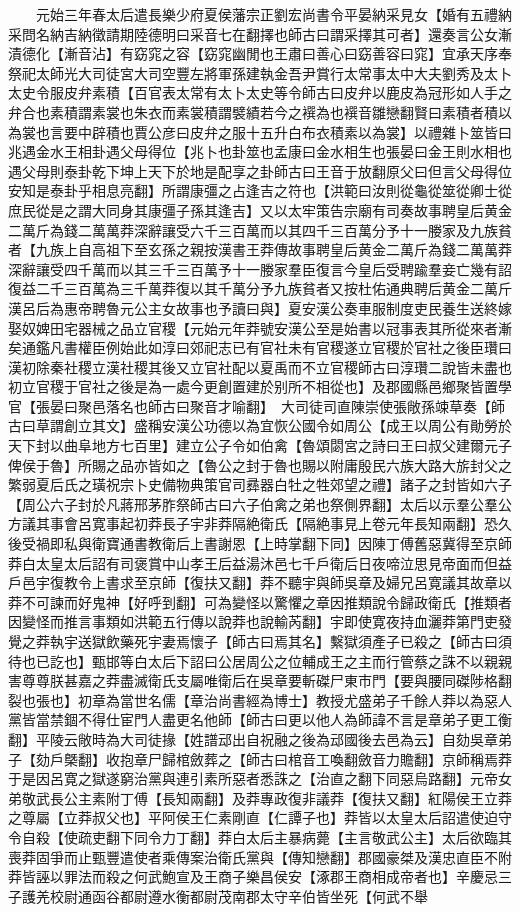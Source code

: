 　　元始三年春太后遣長樂少府夏侯藩宗正劉宏尚書令平晏納采見女【婚有五禮納采問名納吉納徵請期陸德明曰采音七在翻擇也師古曰謂采擇其可者】還奏言公女漸漬德化【漸音沾】有窈窕之容【窈窕幽閒也王肅曰善心曰窈善容曰窕】宜承天序奉祭祀太師光大司徒宮大司空豐左將軍孫建執金吾尹賞行太常事太中大夫劉秀及太卜太史令服皮弁素積【百官表太常有太卜太史等令師古曰皮弁以鹿皮為冠形如人手之弁合也素積謂素裳也朱衣而素裳積謂襞績若今之襈為也襈音雛戀翻賢曰素積者積以為裳也言要中辟積也賈公彦曰皮弁之服十五升白布衣積素以為裳】以禮雜卜筮皆曰兆遇金水王相卦遇父母得位【兆卜也卦筮也孟康曰金水相生也張晏曰金王則水相也遇父母則泰卦乾下坤上天下於地是配享之卦師古曰王音于放翻原父曰但言父母得位安知是泰卦乎相息亮翻】所謂康彊之占逢吉之符也【洪範曰汝則從龜從筮從卿士從庶民從是之謂大同身其康彊子孫其逢吉】又以太牢策告宗廟有司奏故事聘皇后黄金二萬斤為錢二萬萬莽深辭讓受六千三百萬而以其四千三百萬分予十一媵家及九族貧者【九族上自高祖下至玄孫之親按漢書王莽傳故事聘皇后黄金二萬斤為錢二萬萬莽深辭讓受四千萬而以其三千三百萬予十一媵家羣臣復言今皇后受聘踰羣妾亡幾有詔復益二千三百萬為三千萬莽復以其千萬分予九族貧者又按杜佑通典聘后黄金二萬斤漢呂后為惠帝聘魯元公主女故事也予讀曰與】夏安漢公奏車服制度吏民養生送終嫁娶奴婢田宅器械之品立官稷【元始元年莽號安漢公至是始書以冠事表其所從來者漸矣通鑑凡書權臣例始此如淳曰郊祀志已有官社未有官稷遂立官稷於官社之後臣瓚曰漢初除秦社稷立漢社稷其後又立官社配以夏禹而不立官稷師古曰淳瓚二說皆未盡也初立官稷于官社之後是為一處今更創置建於别所不相從也】及郡國縣邑鄉聚皆置學官【張晏曰聚邑落名也師古曰聚音才喻翻】　大司徒司直陳崇使張敞孫竦草奏【師古曰草謂創立其文】盛稱安漢公功德以為宜恢公國令如周公【成王以周公有勛勞於天下封以曲阜地方七百里】建立公子令如伯禽【魯頌閟宮之詩曰王曰叔父建爾元子俾侯于魯】所賜之品亦皆如之【魯公之封于魯也賜以附庸殷民六族大路大旂封父之繁弱夏后氏之璜祝宗卜史備物典策官司彞器白牡之牲郊望之禮】諸子之封皆如六子【周公六子封於凡蔣邢茅胙祭師古曰六子伯禽之弟也祭側界翻】太后以示羣公羣公方議其事會呂寛事起初莽長子宇非莽隔絶衛氏【隔絶事見上卷元年長知兩翻】恐久後受禍即私與衛寶通書教衛后上書謝恩【上時掌翻下同】因陳丁傅舊惡冀得至京師莽白太皇太后詔有司褒賞中山孝王后益湯沐邑七千戶衛后日夜啼泣思見帝面而但益戶邑宇復教令上書求至京師【復扶又翻】莽不聽宇與師吳章及婦兄呂寛議其故章以莽不可諫而好鬼神【好呼到翻】可為變怪以驚懼之章因推類說令歸政衛氏【推類者因變怪而推言事類如洪範五行傳以說莽也說輸芮翻】宇即使寛夜持血灑莽第門吏發覺之莽執宇送獄飲藥死宇妻焉懷子【師古曰焉其名】繫獄須產子已殺之【師古曰須待也已訖也】甄邯等白太后下詔曰公居周公之位輔成王之主而行管蔡之誅不以親親害尊尊朕甚嘉之莽盡滅衛氏支屬唯衛后在吳章要斬磔尸東市門【要與腰同磔陟格翻裂也張也】初章為當世名儒【章治尚書經為博士】教授尤盛弟子千餘人莽以為惡人黨皆當禁錮不得仕宦門人盡更名他師【師古曰更以他人為師諱不言是章弟子更工衡翻】平陵云敞時為大司徒掾【姓譜䢵出自祝融之後為䢵國後去邑為云】自劾吳章弟子【劾戶槩翻】收抱章尸歸棺斂葬之【師古曰棺音工喚翻斂音力贍翻】京師稱焉莽于是因呂寛之獄遂窮治黨與連引素所惡者悉誅之【治直之翻下同惡烏路翻】元帝女弟敬武長公主素附丁傅【長知兩翻】及莽專政復非議莽【復扶又翻】紅陽侯王立莽之尊屬【立莽叔父也】平阿侯王仁素剛直【仁譚子也】莽皆以太皇太后詔遣使迫守令自殺【使疏吏翻下同令力丁翻】莽白太后主暴病薨【主言敬武公主】太后欲臨其喪莽固爭而止甄豐遣使者乘傳案治衛氏黨與【傳知戀翻】郡國豪桀及漢忠直臣不附莽皆誣以罪法而殺之何武鮑宣及王商子樂昌侯安【涿郡王商相成帝者也】辛慶忌三子護羌校尉通函谷都尉遵水衡都尉茂南郡太守辛伯皆坐死【何武不舉